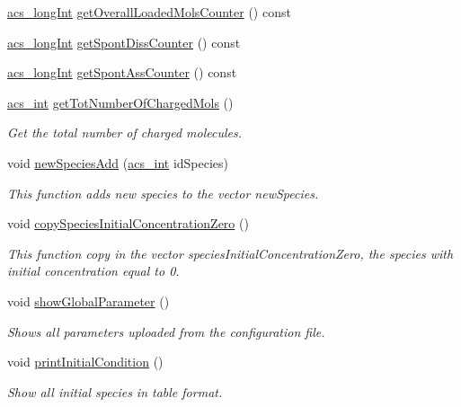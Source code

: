 \begin{DoxyCompactItemize}
\item 
\hyperlink{a00016_a19319d75f02db4308bc5c0026d98cd85}{acs\-\_\-long\-Int} \hyperlink{a00003_a75329459280bc79537a5c08883449a63}{get\-Overall\-Loaded\-Mols\-Counter} () const 
\item 
\hyperlink{a00016_a19319d75f02db4308bc5c0026d98cd85}{acs\-\_\-long\-Int} \hyperlink{a00003_a914378e80f148a4b24fc8e27ebb02198}{get\-Spont\-Diss\-Counter} () const 
\item 
\hyperlink{a00016_a19319d75f02db4308bc5c0026d98cd85}{acs\-\_\-long\-Int} \hyperlink{a00003_ab3c423ac69aac398c087cde1dcb0dccb}{get\-Spont\-Ass\-Counter} () const 
\item 
\hyperlink{a00016_a8d277355641a098190360234e2ebde35}{acs\-\_\-int} \hyperlink{a00003_aadb5c442d5c9d16a0d6b2e90715dda94}{get\-Tot\-Number\-Of\-Charged\-Mols} ()
\begin{DoxyCompactList}\small\item\em Get the total number of charged molecules. \end{DoxyCompactList}\item 
void \hyperlink{a00003_a4721ebd79c1f52a583fd60ff8f2ece2c}{new\-Species\-Add} (\hyperlink{a00016_a8d277355641a098190360234e2ebde35}{acs\-\_\-int} id\-Species)
\begin{DoxyCompactList}\small\item\em This function adds new species to the vector new\-Species. \end{DoxyCompactList}\item 
void \hyperlink{a00003_a375fc2dc0afc38a8a3afbd016acc4983}{copy\-Species\-Initial\-Concentration\-Zero} ()
\begin{DoxyCompactList}\small\item\em This function copy in the vector species\-Initial\-Concentration\-Zero, the species with initial concentration equal to 0. \end{DoxyCompactList}\item 
void \hyperlink{a00003_af959a6b6a72cb6226fef7f0e7fab5c0c}{show\-Global\-Parameter} ()
\begin{DoxyCompactList}\small\item\em Shows all parameters uploaded from the configuration file. \end{DoxyCompactList}\item 
void \hyperlink{a00003_a429c2529badaeda72e553f500b990e11}{print\-Initial\-Condition} ()
\begin{DoxyCompactList}\small\item\em Show all initial species in table format. \end{DoxyCompactList}\item 

\end{DoxyCompactItemize}
